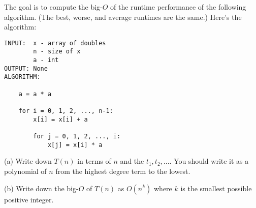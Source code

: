 The goal is to compute the big-$O$ of the runtime performance
of the following algorithm. 
(The best, worse, and average runtimes are the same.)
Here's the algorithm:
\begin{Verbatim}[frame=single]
INPUT:  x - array of doubles
        n - size of x
        a - int
OUTPUT: None
ALGORITHM:

    a = a * a                              

    for i = 0, 1, 2, ..., n-1:
        x[i] = x[i] + a                    

        for j = 0, 1, 2, ..., i:
            x[j] = x[i] * a                

\end{Verbatim}

(a) Write down $T(n)$ in terms of $n$ and the $t_1, t_2, ...$.
You should write it as a polynomial of $n$ from the highest
degree term to the lowest.

(b) Write down the big-$O$ of $T(n)$ as $O(n^k)$
where $k$ is the smallest possible  positive integer.

